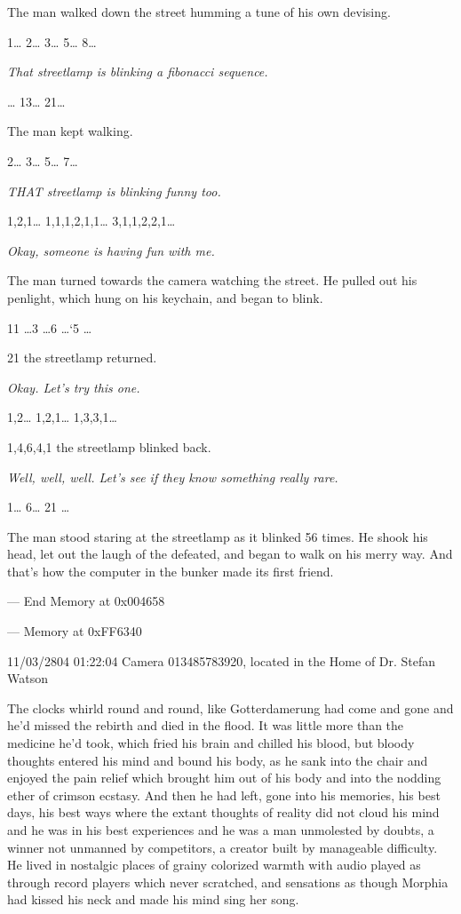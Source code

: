 \documentclass[12pt]{article}
\begin{document}
The man walked down the street humming a tune of his own devising.

1\ldots{} 2\ldots{} 3\ldots{} 5\ldots{} 8\ldots{}

\emph{That streetlamp is blinking a fibonacci sequence.}

\ldots{} 13\ldots{} 21\ldots{}

The man kept walking.

2\ldots{} 3\ldots{} 5\ldots{} 7\ldots{}

\emph{THAT streetlamp is blinking funny too.}

1,2,1\ldots{} 1,1,1,2,1,1\ldots{} 3,1,1,2,2,1\ldots{}

\emph{Okay, someone is having fun with me.}

The man turned towards the camera watching the street. He pulled out his penlight, which hung on his keychain, and began to blink.

11 \ldots{}3 \ldots{}6 \ldots{}`5 \ldots{}

21 the streetlamp returned.

\emph{Okay. Let's try this one.}

1,2\ldots{} 1,2,1\ldots{} 1,3,3,1\ldots{}

1,4,6,4,1 the streetlamp blinked back.

\emph{Well, well, well. Let's see if they know something really rare.}

1\ldots{} 6\ldots{} 21 \ldots{}

The man stood staring at the streetlamp as it blinked 56 times. He shook his head, let out the laugh of the defeated, and began to walk on his merry way.
And that's how the computer in the bunker made its first friend.

--- End Memory at 0x004658

--- Memory at 0xFF6340

11/03/2804 01:22:04 Camera 013485783920, located in the Home of Dr. Stefan Watson

The clocks whirld round and round, like Gotterdamerung had come and gone and he'd missed the rebirth and died in the flood. It was little more than the medicine he'd took, which fried his brain and chilled his blood, but bloody thoughts entered his mind and bound his body, as he sank into the chair and enjoyed the pain relief which brought him out of his body and into the nodding ether of crimson ecstasy. And then he had left, gone into his memories, his best days, his best ways where the extant thoughts of reality did not cloud his mind and he was in his best experiences and he was a man unmolested by doubts, a winner not unmanned by competitors, a creator built by manageable difficulty. He lived in nostalgic places of grainy colorized warmth with audio played as through record players which never scratched, and sensations as though Morphia had kissed his neck and made his mind sing her song.
\end{document}

